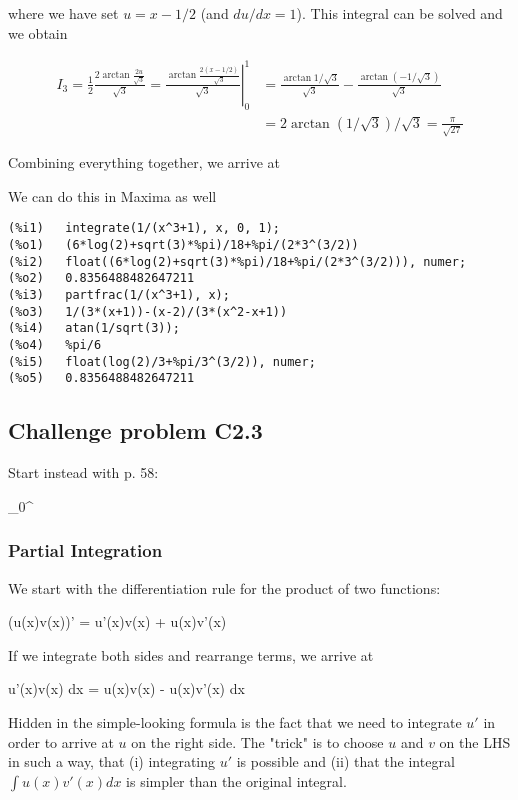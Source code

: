 where we have set $u=x-1/2$ (and $du/dx=1$). This integral can be solved and we obtain

\begin{align*}
I_3 = \frac{1}{2} \frac{2 \arctan \frac{2u}{\sqrt{3}}}{\sqrt{3}} = \left. \frac{ \arctan \frac{2(x-1/2)}{\sqrt{3}}}{\sqrt{3}} \right|_0^1 & = \frac{\arctan 1/\sqrt{3}}{\sqrt{3}} - \frac{\arctan \left(-1/\sqrt{3}\right) }{\sqrt{3}} \\ & = 2 \arctan \left(1/\sqrt{3}\right)/\sqrt{3} = \frac{\pi}{\sqrt{27}}
\end{align*}

Combining everything together, we arrive at

\bee
{}
\eee

We can do this in Maxima as well

\begin{verbatim}
(%i1)	integrate(1/(x^3+1), x, 0, 1);
(%o1)	(6*log(2)+sqrt(3)*%pi)/18+%pi/(2*3^(3/2))
(%i2)	float((6*log(2)+sqrt(3)*%pi)/18+%pi/(2*3^(3/2))), numer;
(%o2)	0.8356488482647211
(%i3)	partfrac(1/(x^3+1), x);
(%o3)	1/(3*(x+1))-(x-2)/(3*(x^2-x+1))
(%i4)	atan(1/sqrt(3));
(%o4)	%pi/6
(%i5)	float(log(2)/3+%pi/3^(3/2)), numer;
(%o5)	0.8356488482647211
\end{verbatim}


\subsection{Challenge problem  C2.3}

Start instead with p. 58:

\bee
\int_0^\infty {}
\eee


\subsubsection{Partial Integration}

We start with the differentiation rule for the product of two functions:

\bee
\left(u(x)v(x)\right)' = u'(x)v(x) + u(x)v'(x)
\eee

If we integrate both sides and rearrange terms, we arrive at

\be
\label{2018-03-26:eq1}
\int u'(x)v(x) dx  = u(x)v(x) - \int u(x)v'(x) dx
\ee

Hidden in the simple-looking formula is the fact that we need to integrate $u'$ in order to arrive at $u$ on the right side. The "trick" is to choose $u$ and $v$ on the LHS in such a way, that (i) integrating $u'$ is possible and (ii) that the integral $\int u(x)v'(x) dx$ is simpler than the original integral.

